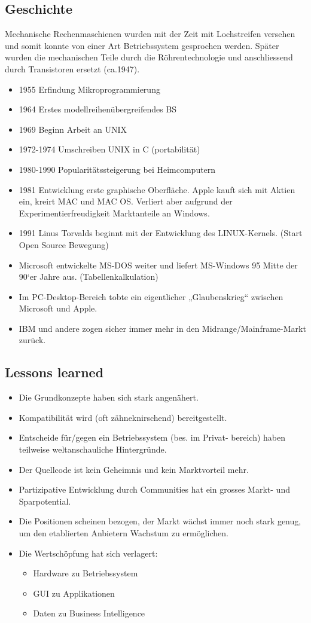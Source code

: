 \documentclass[a4paper, 10pt]{article}
\begin{document}
\subsection{Geschichte}
Mechanische Rechenmaschienen wurden mit der Zeit mit Lochstreifen versehen und somit konnte von einer Art Betriebssystem gesprochen werden. Später wurden die mechanischen Teile  durch die Röhrentechnologie und anschliessend durch Transistoren ersetzt (ca.1947).
\begin{itemize}
\item 1955 Erfindung Mikroprogrammierung
\item 1964 Erstes modellreihenübergreifendes BS
\item 1969 Beginn Arbeit an UNIX
\item 1972-1974 Umschreiben UNIX in C (portabilität)
\item 1980-1990 Popularitätssteigerung bei Heimcomputern
\item 1981 Entwicklung erste graphische Oberfläche. Apple kauft sich mit Aktien ein, kreirt MAC und MAC OS. Verliert aber aufgrund der Experimentierfreudigkeit Marktanteile an Windows.
\item 1991 Linus Torvalds beginnt mit der Entwicklung des LINUX-Kernels. (Start Open Source Bewegung)
\item Microsoft entwickelte MS-DOS weiter und liefert MS-Windows
95 Mitte der 90‘er Jahre aus. (Tabellenkalkulation)
\item Im PC-Desktop-Bereich tobte ein eigentlicher „Glaubenskrieg“ zwischen Microsoft und Apple.
\item IBM und andere zogen sicher immer mehr in den Midrange/Mainframe-Markt zurück.
\end{itemize}

\subsection{Lessons learned}
\begin{itemize}


\item Die Grundkonzepte haben sich stark angenähert.
\item Kompatibilität wird (oft zähneknirschend) bereitgestellt.
\item Entscheide für/gegen ein Betriebssystem (bes. im Privat-
bereich) haben teilweise weltanschauliche Hintergründe.
\item Der Quellcode ist kein Geheimnis und kein Marktvorteil mehr.
\item Partizipative Entwicklung durch Communities hat ein grosses
Markt- und Sparpotential.
\item Die Positionen scheinen bezogen, der Markt wächst immer
noch stark genug, um den etablierten Anbietern Wachstum zu
ermöglichen.
\item Die Wertschöpfung hat sich verlagert:
\begin{itemize}
\item Hardware zu Betriebssystem
\item GUI zu Applikationen
\item Daten zu Business Intelligence
\end{itemize}
\end{itemize}
\newpage
\end{document}
